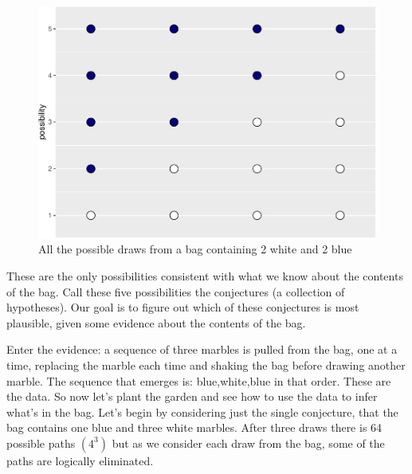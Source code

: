 \documentclass{article}
\begin{document}
\begin{figure}

{\centering \includegraphics{qrap_paper_files/figure-latex/possibilities-1} 

}

\caption{All the possible draws from a bag containing 2 white and 2 blue}\label{fig:possibilities}
\end{figure}

These are the only possibilities consistent with what we know about the
contents of the bag. Call these five possibilities the conjectures (a
collection of hypotheses). Our goal is to figure out which of these
conjectures is most plausible, given some evidence about the contents of
the bag.

Enter the evidence: a sequence of three marbles is pulled from the bag,
one at a time, replacing the marble each time and shaking the bag before
drawing another marble. The sequence that emerges is: blue,white,blue in
that order. These are the data. So now let's plant the garden and see
how to use the data to infer what's in the bag. Let's begin by
considering just the single conjecture, that the bag contains one blue
and three white marbles. After three draws there is 64 possible paths
\((4^3)\) but as we consider each draw from the bag, some of the paths
are logically eliminated.
\end{document}

